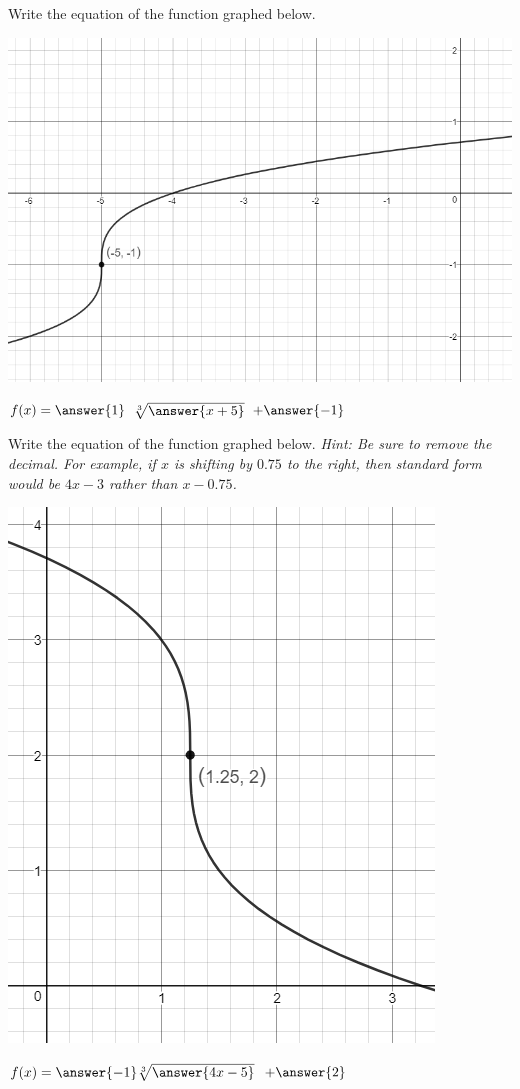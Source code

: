\documentclass{ximera}
\begin{document}
\begin{question}
Write the equation of the function graphed below. 

\includegraphics{graphRadicalQ3.png}

$f(x) = \answer{1}$ $\sqrt[3]{\answer{x+5}}$ $+ \answer{-1}$ 

\end{question}

\begin{question}
Write the equation of the function graphed below. \textit{Hint: Be sure to remove the decimal. For example, if $x$ is shifting by $0.75$ to the right, then standard form would be $4x-3$ rather than $x-0.75$.}

\includegraphics{graphRadicalQ4.png}

$f(x) = \answer{-1} \sqrt[3]{\answer{4x-5}}$ $+ \answer{2}$

\end{question}
\end{document}
